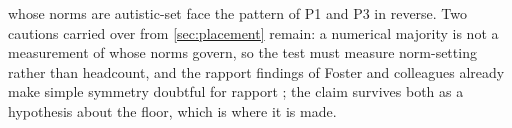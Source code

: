 whose norms are autistic-set face the pattern of P1 and P3 in reverse. Two cautions carried over from \autoref{sec:placement} remain: a numerical majority is not a measurement of whose norms govern, so the test must measure norm-setting rather than headcount, and the rapport findings of Foster and colleagues already make simple symmetry doubtful for rapport \cite{Foster2025}; the claim survives both as a hypothesis about the floor, which is where it is made.
